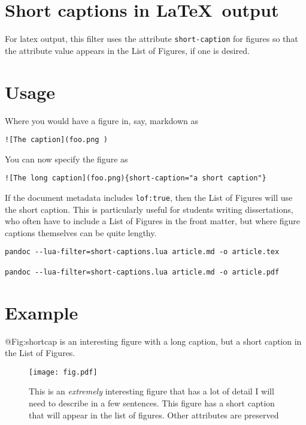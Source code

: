 \hypertarget{short-captions-in-output}{%
\section{\texorpdfstring{Short captions in
\LaTeX~output}{Short captions in ~output}}\label{short-captions-in-output}}

For latex output, this filter uses the attribute \texttt{short-caption}
for figures so that the attribute value appears in the List of Figures,
if one is desired.

\hypertarget{usage}{%
\section{Usage}\label{usage}}

Where you would have a figure in, say, markdown as

\begin{verbatim}
![The caption](foo.png ) 
\end{verbatim}

You can now specify the figure as

\begin{verbatim}
![The long caption](foo.png){short-caption="a short caption"} 
\end{verbatim}

If the document metadata includes \texttt{lof:true}, then the List of
Figures will use the short caption. This is particularly useful for
students writing dissertations, who often have to include a List of
Figures in the front matter, but where figure captions themselves can be
quite lengthy.

\begin{verbatim}
pandoc --lua-filter=short-captions.lua article.md -o article.tex

pandoc --lua-filter=short-captions.lua article.md -o article.pdf
\end{verbatim}

\hypertarget{example}{%
\section{Example}\label{example}}

@Fig:shortcap is an interesting figure with a long caption, but a short
caption in the List of Figures.

\begin{figure}
\hypertarget{fig:shortcap}{%
\centering
\texttt{[image: fig.pdf]}
\caption[{A short caption with math \(x^n + y^n = z^n\)}]{This is an
\emph{extremely} interesting figure that has a lot of detail I will need
to describe in a few sentences. This figure has a short caption that
will appear in the list of figures. Other attributes are
preserved}\label{fig:shortcap}
}
\end{figure}

